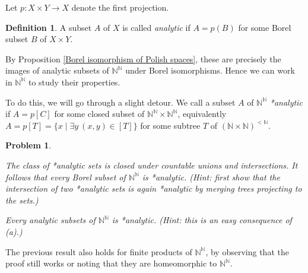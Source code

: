\documentclass[10pt]{amsart}
\newcommand{\NN}{\mathbb{N}}
\newtheorem{problem}[theorem]{Problem}
\theoremstyle{definition}
\newtheorem{definition}[theorem]{Definition}
\theoremstyle{remark}
\newenvironment{enumerate-(a)}{\begin{enumerate}[label={\upshape (\alph*)}, leftmargin=2pc]}{\end{enumerate}}
\begin{document}
Let $p\colon X\times Y\rightarrow X$ denote the first projection. 

\begin{definition} 
A subset $A$ of $X$ is called \emph{analytic} if $A=p(B)$ for some Borel subset $B$ of $X\times Y$. 
\end{definition} 

By Proposition \ref{Borel isomorphism of Polish spaces}, these are precisely the images of analytic subsets of $\NN^\NN$ under Borel isomorphisms. 
Hence we can work in $\NN^\NN$ to study their properties. 

To do this, we will go through a slight detour. 
We call a subset $A$ of $\NN^\NN$ \emph{*analytic} if $A=p[C]$ for some closed subset of $\NN^\NN\times \NN^\NN$, equivalently $A=p[T]=\{x\mid \exists y\ (x,y)\in [T]\}$ for some subtree $T$ of $(\NN\times\NN)^{<\NN}$. 

\begin{problem} \label{characterization of analytic sets} 
\begin{enumerate-(a)} 
\item \label{characterization of analytic sets - closure} 
The class of *analytic sets is closed under countable unions and intersections. It follows that every Borel subset of $\NN^\NN$ is *analytic. 
\emph{(Hint: first show that the intersection of two *analytic sets is again *analytic by merging trees projecting to the sets.) } 
\item 
Every analytic subsets of $\NN^\NN$ is *analytic. 
\emph{(Hint: this is an easy consequence of (a).) } 
\end{enumerate-(a)} 
\end{problem} 

The previous result also holds for finite products of $\NN^\NN$, by observing that the proof still works or noting that they are homeomorphic to $\NN^\NN$. 
\end{document}
